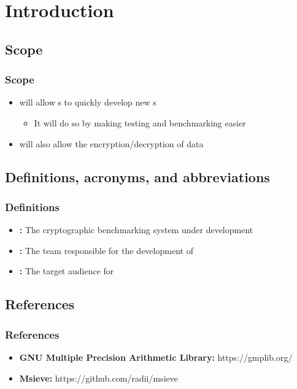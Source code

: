
\section{Introduction}


\subsection{Scope}

\begin{frame}
\frametitle{Scope}
\begin{itemize}
\item \cry{} will allow \cg s to quickly develop new \cs{} s
\begin{itemize}
  \item It will do so by making testing and benchmarking
  easier
\end{itemize}
\item \cry{} will also allow the encryption/decryption of
data
\end{itemize}
\end{frame}


\subsection{Definitions, acronyms, and abbreviations}

\begin{frame}
\frametitle{Definitions}
\begin{itemize}
\item \textbf{\cry{}:} The cryptographic benchmarking system
under development
\item \textbf{\tc{}:} The team responsible for the
development of \cry{}
\item \textbf{\cg:} The target audience for \cry{}
\end{itemize}
\end{frame}


\subsection{References}

\begin{frame}
\frametitle{References}
\begin{itemize}
  \item \textbf{GNU Multiple Precision Arithmetic Library:}
        https://gmplib.org/
  \item \textbf{Msieve:} https://github.com/radii/msieve
\end{itemize}
\end{frame}

